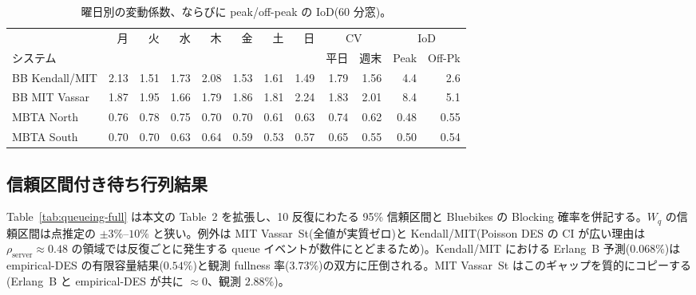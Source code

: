 \begin{table}[h]
\centering
\caption{曜日別の変動係数、ならびに peak/off-peak の IoD(60 分窓)。}
\label{tab:cv-dow}
\footnotesize
\begin{tabular}{@{}lrrrrrrr|rr|rr@{}}
\toprule
& 月 & 火 & 水 & 木 & 金 & 土 & 日 & \multicolumn{2}{c|}{CV} & \multicolumn{2}{c}{IoD} \\
システム & & & & & & & & 平日 & 週末 & Peak & Off-Pk \\
\midrule
BB Kendall/MIT & 2.13 & 1.51 & 1.73 & 2.08 & 1.53 & 1.61 & 1.49 & 1.79 & 1.56 & 4.4 & 2.6 \\
BB MIT Vassar  & 1.87 & 1.95 & 1.66 & 1.79 & 1.86 & 1.81 & 2.24 & 1.83 & 2.01 & 8.4 & 5.1 \\
MBTA North     & 0.76 & 0.78 & 0.75 & 0.70 & 0.70 & 0.61 & 0.63 & 0.74 & 0.62 & 0.48 & 0.55 \\
MBTA South     & 0.70 & 0.70 & 0.63 & 0.64 & 0.59 & 0.53 & 0.57 & 0.65 & 0.55 & 0.50 & 0.54 \\
\bottomrule
\end{tabular}
\end{table}

\subsection{信頼区間付き待ち行列結果}\label{app:queueing-full}

Table~\ref{tab:queueing-full} は本文の Table~2 を拡張し、10 反復にわたる 95\% 信頼区間と Bluebikes の Blocking 確率を併記する。$W_q$ の信頼区間は点推定の $\pm 3\%$--$10\%$ と狭い。例外は MIT Vassar~St(全値が実質ゼロ)と Kendall/MIT(Poisson DES の CI が広い理由は $\rho_{\text{server}} \approx 0.48$ の領域では反復ごとに発生する queue イベントが数件にとどまるため)。Kendall/MIT における Erlang~B 予測($0.068\%$)は empirical-DES の有限容量結果($0.54\%$)と観測 fullness 率($3.73\%$)の双方に圧倒される。MIT Vassar~St はこのギャップを質的にコピーする(Erlang~B と empirical-DES が共に $\approx 0$、観測 $2.88\%$)。

